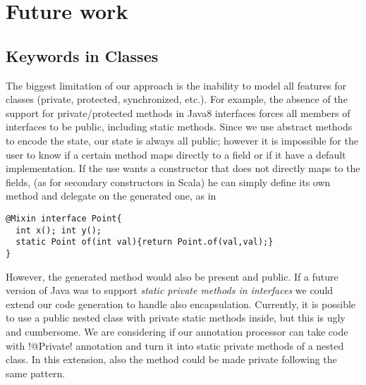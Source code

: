 \section{Future work}\label{sec:futurework}

\subsection{Keywords in Classes} %
The biggest limitation of our approach is the inability to model all features
for classes (private, protected, synchronized, etc.). For example, the absence
of the support for private/protected methods in Java8 interfaces forces all
members of interfaces to be public, including static methods. Since we use
abstract methods to encode the state, our state is always all public; however it
is impossible for the user to know if a certain method maps directly to a field
or if it have a default implementation.  If the use wants a constructor that
does not directly maps to the fields, (as for secondary constructors in Scala)
he can simply define its own \Q@of@ method and delegate on the generated one, as
in
\begin{lstlisting}
@Mixin interface Point{
  int x(); int y();
  static Point of(int val){return Point.of(val,val);}  
}
\end{lstlisting}
However, the generated \Q@of@ method would also be present and public.  If a
future version of Java was to support \emph{static private methods in
  interfaces} we could extend our code generation to handle also encapsulation.
Currently, it is possible to use a public nested class with private static
methods inside, but this is ugly and cumbersome. We are considering if our
annotation processor can take code with \Q!@Private! annotation and turn it into
static private methods of a nested class. In this extension, also the \Q@of@
method could be made private following the same pattern.

